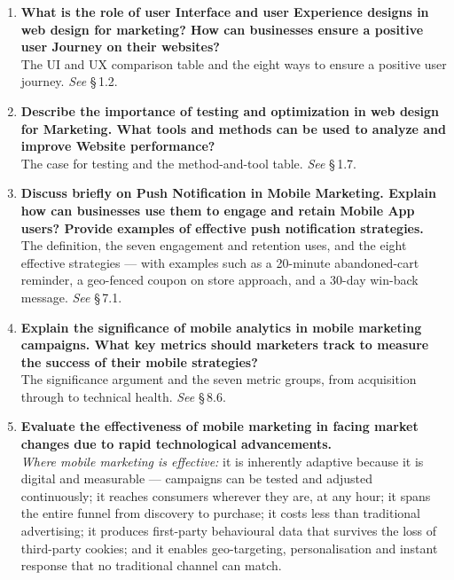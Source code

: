 \begin{enumerate}[leftmargin=2.2em,itemsep=1.4ex]
\item \textbf{What is the role of user Interface and user Experience designs in web
      design for marketing? How can businesses ensure a positive user Journey on
      their websites?} \\
      The UI and UX comparison table and the eight ways to ensure a positive user
      journey. \hfill\emph{See} \S\,1.2.

\item \textbf{Describe the importance of testing and optimization in web design for
      Marketing. What tools and methods can be used to analyze and improve Website
      performance?} \\
      The case for testing and the method-and-tool table.
      \hfill\emph{See} \S\,1.7.

\item \textbf{Discuss briefly on Push Notification in Mobile Marketing. Explain
      how can businesses use them to engage and retain Mobile App users? Provide
      examples of effective push notification strategies.}
      \\
      The definition, the seven engagement and retention uses, and the eight
      effective strategies --- with examples such as a 20-minute abandoned-cart
      reminder, a geo-fenced coupon on store approach, and a 30-day win-back
      message. \hfill\emph{See} \S\,7.1.

\item \textbf{Explain the significance of mobile analytics in mobile marketing
      campaigns. What key metrics should marketers track to measure the success of
      their mobile strategies?} \\
      The significance argument and the seven metric groups, from acquisition
      through to technical health. \hfill\emph{See} \S\,8.6.

\item \textbf{Evaluate the effectiveness of mobile marketing in facing market
      changes due to rapid technological advancements.}
      \\
      \emph{Where mobile marketing is effective:} it is inherently adaptive
      because it is digital and measurable --- campaigns can be tested and
      adjusted continuously; it reaches consumers wherever they are, at any hour;
      it spans the entire funnel from discovery to purchase; it costs less than
      traditional advertising; it produces first-party behavioural data that
      survives the loss of third-party cookies; and it enables geo-targeting,
      personalisation and instant response that no traditional channel can match.


\end{enumerate}
